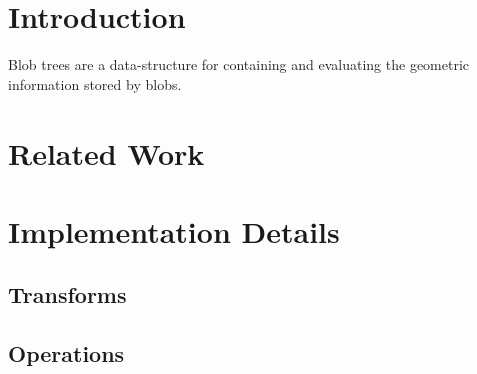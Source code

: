 \documentclass[conference]{acmsiggraph}
\title{\Title}
\author{
	\Author \\
	University of Victoria\\
\Email}
\begin{document}

\maketitle

\begin{abstract}
	Implicit surfaces are a mathematical representation of geometric
	information; storing complex geometric information with minimal memory
	requirements. Blobs are a form of implicit object defined by a central
	origin point, a \fff, and an iso value. The surface is defined at
	radius $r$ when the \fff evaluated on $r$ is equal to the iso value.

	A blob tree is used to build complex geometry from simpler
	primitives. Intelligent construction of the blob-tree is critical for
	fast evaluation of the implicit object represented in the tree, whether
	that be for ray-tracing or polygonization.

\end{abstract}

\keywordlist

\copyrightspace

\section{Introduction}
Blob trees are a data-structure for containing and evaluating the geometric
information stored by blobs.
\section{Related Work}
\section{Implementation Details}
\subsection{Transforms}
\subsection{Operations}
\end{document}
